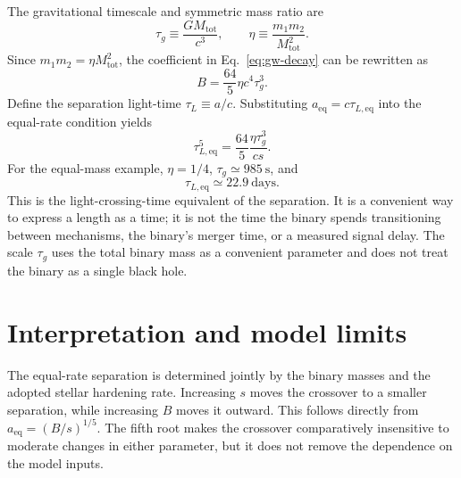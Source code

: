 \documentclass[12pt]{article}
\begin{document}
The gravitational timescale and symmetric mass ratio are
\begin{equation}
  \tau_g\equiv\frac{GM_{\mathrm{tot}}}{c^3},
  \qquad
  \eta\equiv\frac{m_1m_2}{M_{\mathrm{tot}}^2}.
  \label{eq:time-variables}
\end{equation}
Since $m_1m_2=\eta M_{\mathrm{tot}}^2$, the coefficient in Eq.~\eqref{eq:gw-decay} can be rewritten as
\begin{equation}
  B=\frac{64}{5}\eta c^4\tau_g^3.
  \label{eq:B-time-form}
\end{equation}
Define the separation light-time $\tau_L\equiv a/c$. Substituting $a_{\mathrm{eq}}=c\tau_{L,\mathrm{eq}}$ into the equal-rate condition yields
\begin{equation}
  \boxed{\tau_{L,\mathrm{eq}}^5
  =\frac{64}{5}\frac{\eta\tau_g^3}{cs}.}
  \label{eq:lighttime-crossover}
\end{equation}
For the equal-mass example, $\eta=1/4$, $\tau_g\simeq985\ \mathrm{s}$, and
\begin{equation}
  \tau_{L,\mathrm{eq}}\simeq22.9\ \mathrm{days}.
  \label{eq:example-lighttime}
\end{equation}
This is the light-crossing-time equivalent of the separation. It is a convenient way to express a length as a time; it is not the time the binary spends transitioning between mechanisms, the binary's merger time, or a measured signal delay. The scale $\tau_g$ uses the total binary mass as a convenient parameter and does not treat the binary as a single black hole.

\section{Interpretation and model limits}

The equal-rate separation is determined jointly by the binary masses and the adopted stellar hardening rate. Increasing $s$ moves the crossover to a smaller separation, while increasing $B$ moves it outward. This follows directly from $a_{\mathrm{eq}}=(B/s)^{1/5}$. The fifth root makes the crossover comparatively insensitive to moderate changes in either parameter, but it does not remove the dependence on the model inputs.
\end{document}
